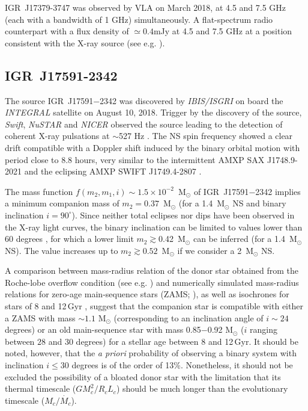 \documentclass[graybox]{svmult}
\def \inte {{\em INTEGRAL\xspace}}
\def \ibis  {{\em IBIS/ISGRI\xspace}}
\def \swift {{\em Swift\xspace}}
\def \igrsev{{\rm IGR~J17591$-$2342\xspace}}
\def \nustar{{\em NuSTAR\xspace}}
\def \nicer{{\em NICER\xspace}}
\begin{document}
IGR~J17379-3747 was observed by VLA on March 2018, at 4.5 and 7.5 GHz (each with a bandwidth of 1 GHz) simultaneously. A flat-spectrum radio counterpart with a flux density of $\simeq0.4$mJy at 4.5 and 7.5 GHz at a position consistent with the X-ray source (see e.g. \cite{vandenEijnden2018b}). 

\subsection{IGR~J17591-2342}
The source \igrsev{} was discovered by \ibis{} on board the \inte{} satellite on August 10, 2018. Trigger by the discovery of the source, \swift{}, \nustar{} and \nicer{} observed the source leading to the detection of coherent X-ray pulsations at $\sim$527 Hz \cite{Sanna2018c}. The NS spin frequency showed a clear drift compatible with a Doppler shift induced by the binary orbital motion with period close to 8.8 hours, very similar to the intermittent AMXP SAX J1748.9-2021 \cite{Altamirano2008} and the eclipsing AMXP SWIFT J1749.4-2807 \cite{Markwardt2010b,Altamirano2011, Ferrigno2011}.

The mass function $f(m_2, m_1, i)\sim1.5 \times 10^{-2}$~M$_{\odot}$ of \igrsev{} implies a minimum companion mass of $m_2=0.37$~M$_{\odot}$ (for a 1.4~M$_{\odot}$ NS and binary inclination $i=90^{\circ}$). Since neither total eclipses nor dips have been observed in the X-ray light curves, the binary inclination can be limited to values lower than 60 degrees %
\cite{Frank2002}, for which a lower limit $m_2 \gtrsim $0.42~M$_{\odot}$ can be inferred (for a 1.4~M$_{\odot}$ NS). The value increases up to $m_2 \gtrsim 0.52$~M$_{\odot}$ if we consider a 2~M$_{\odot}$ NS. 

A comparison between mass-radius relation of the donor star obtained from the Roche-lobe overflow condition (see e.g. \cite{Sanna2018c}) and numerically simulated mass-radius relations for zero-age main-sequence stars (ZAMS; \cite{Tout1996}), as well as isochrones for stars of 8 and 12\,Gyr \cite{Girardi2000}, suggest that the companion star is compatible with either a ZAMS with mass $\sim1.1$ M$_\odot$ (corresponding to an inclination angle of $i\sim24$ degrees) or an old main-sequence star with mass 0.85$-$0.92 M$_\odot$ ($i$ ranging between $28$ and $30$ degrees) for a stellar age between 8 and 12\,Gyr. It should be noted, however, that the \textit{\textup{a priori}} probability of observing a binary system with inclination $i\leq 30$ degrees is of the order of 13\%. Nonetheless, it should not be excluded the possibility of a bloated donor star with the limitation that its thermal timescale ($GM^2_c/R_c L_c$) should be much longer than the evolutionary timescale ($M_c/\dot{M_c}$).
\end{document}
